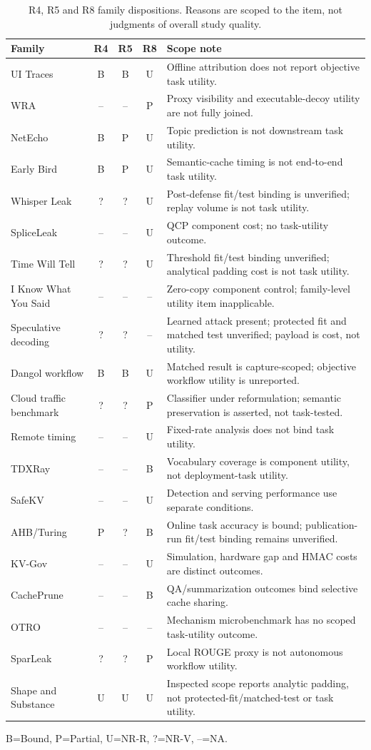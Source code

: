 \begin{table}[t]\centering\footnotesize
\caption{R4, R5 and R8 family dispositions. Reasons are scoped to the item, not judgments of overall study quality.}\label{tab:r8-family-reasons}
\begin{tabularx}{\textwidth}{@{}lcccX@{}}\toprule
Family & R4 & R5 & R8 & Scope note\\\midrule
UI Traces & B & B & U & Offline attribution does not report objective task utility.\\
WRA & -- & -- & P & Proxy visibility and executable-decoy utility are not fully joined.\\
NetEcho & B & P & U & Topic prediction is not downstream task utility.\\
Early Bird & B & P & U & Semantic-cache timing is not end-to-end task utility.\\
Whisper Leak & ? & ? & U & Post-defense fit/test binding is unverified; replay volume is not task utility.\\
SpliceLeak & -- & -- & U & QCP component cost; no task-utility outcome.\\
Time Will Tell & ? & ? & U & Threshold fit/test binding unverified; analytical padding cost is not task utility.\\
I Know What You Said & -- & -- & -- & Zero-copy component control; family-level utility item inapplicable.\\
Speculative decoding & ? & ? & -- & Learned attack present; protected fit and matched test unverified; payload is cost, not utility.\\
Dangol workflow & B & B & U & Matched result is capture-scoped; objective workflow utility is unreported.\\
Cloud traffic benchmark & ? & ? & P & Classifier under reformulation; semantic preservation is asserted, not task-tested.\\
Remote timing & -- & -- & U & Fixed-rate analysis does not bind task utility.\\
TDXRay & -- & -- & B & Vocabulary coverage is component utility, not deployment-task utility.\\
SafeKV & -- & -- & U & Detection and serving performance use separate conditions.\\
AHB/Turing & P & ? & B & Online task accuracy is bound; publication-run fit/test binding remains unverified.\\
KV-Gov & -- & -- & U & Simulation, hardware gap and HMAC costs are distinct outcomes.\\
CachePrune & -- & -- & B & QA/summarization outcomes bind selective cache sharing.\\
OTRO & -- & -- & -- & Mechanism microbenchmark has no scoped task-utility outcome.\\
SparLeak & ? & ? & P & Local ROUGE proxy is not autonomous workflow utility.\\
Shape and Substance & U & U & U & Inspected scope reports analytic padding, not protected-fit/matched-test or task utility.\\\bottomrule
\end{tabularx}\end{table}
\noindent\footnotesize B=Bound, P=Partial, U=NR-R, ?=NR-V, --=NA.

